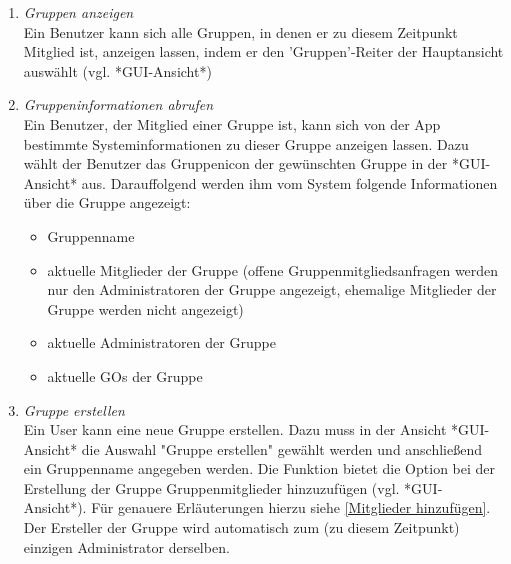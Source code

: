 \documentclass[parskip=full]{scrartcl}
\def\threedigits#1{%
  \ifnum#1<100 0\fi
  \ifnum#1<10 0\fi
  \number#1}
\begin{document}
\begin{enumerate}[label={\textbf{/F\protect\threedigits{\theenumi}0/}}, leftmargin=*, resume]
	\item \textit{Gruppen anzeigen} \\ %
	Ein Benutzer kann sich alle Gruppen, in denen er zu diesem Zeitpunkt Mitglied ist, anzeigen lassen, indem er den 'Gruppen'-Reiter der \gls{Hauptansicht} auswählt (vgl. *GUI-Ansicht*)
	
	\item \textit{Gruppeninformationen abrufen} \label{Gruppeninfo anzeigen} \\%
	Ein Benutzer, der Mitglied einer Gruppe ist, kann sich von der App bestimmte Systeminformationen zu dieser Gruppe anzeigen lassen. Dazu wählt der Benutzer das Gruppenicon der gewünschten Gruppe in der *GUI-Ansicht* aus. Darauffolgend werden ihm vom System folgende Informationen über die Gruppe angezeigt:
	\begin{itemize}
		\item Gruppenname
		\item aktuelle Mitglieder der Gruppe (offene Gruppenmitgliedsanfragen werden nur den Administratoren der Gruppe angezeigt, ehemalige Mitglieder der Gruppe werden nicht angezeigt)
		\item aktuelle Administratoren der Gruppe
		\item aktuelle \glspl{GO} der Gruppe %
	\end{itemize}
	
	\item \textit{Gruppe erstellen}\\
	Ein User kann eine neue Gruppe erstellen. Dazu muss in der Ansicht *GUI-Ansicht* die Auswahl "Gruppe erstellen" gewählt werden und anschließend ein Gruppenname angegeben werden. Die Funktion bietet die Option bei der Erstellung der Gruppe Gruppenmitglieder hinzuzufügen (vgl. *GUI-Ansicht*). Für genauere Erläuterungen hierzu siehe \ref{Mitglieder hinzufügen}.
	Der Ersteller der Gruppe wird automatisch zum (zu diesem Zeitpunkt) einzigen Administrator derselben.
	

\end{enumerate}
\end{document}
